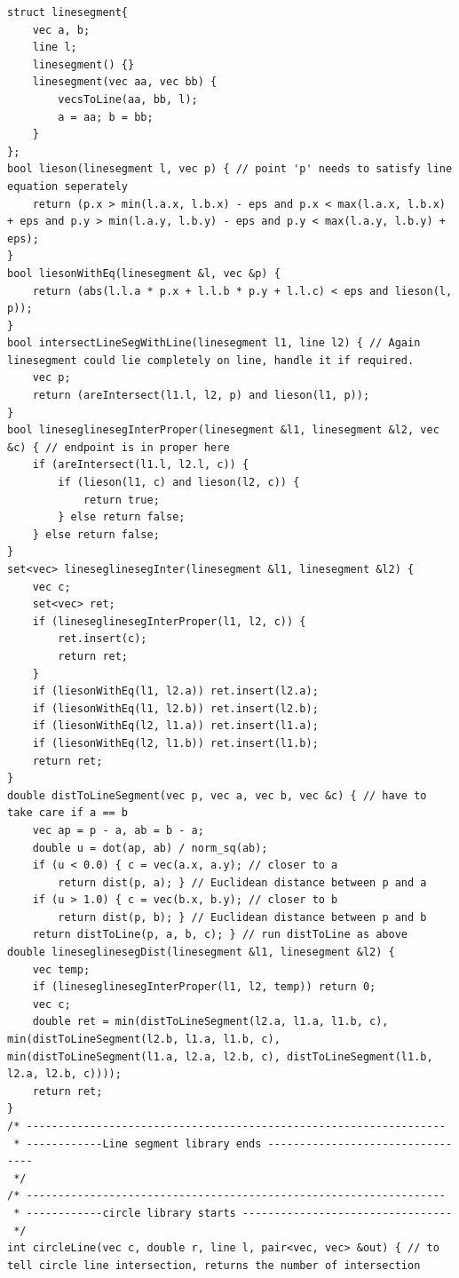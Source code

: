 \documentclass[8pt, a4paper, oneside, twocolumn]{extarticle}
\begin{document}
\begin{verbatim}
struct linesegment{
    vec a, b;
    line l;
    linesegment() {}
    linesegment(vec aa, vec bb) {
        vecsToLine(aa, bb, l);
        a = aa; b = bb;
    }
};
bool lieson(linesegment l, vec p) { // point 'p' needs to satisfy line equation seperately
    return (p.x > min(l.a.x, l.b.x) - eps and p.x < max(l.a.x, l.b.x) + eps and p.y > min(l.a.y, l.b.y) - eps and p.y < max(l.a.y, l.b.y) + eps);
}
bool liesonWithEq(linesegment &l, vec &p) {
    return (abs(l.l.a * p.x + l.l.b * p.y + l.l.c) < eps and lieson(l, p));
}
bool intersectLineSegWithLine(linesegment l1, line l2) { // Again linesegment could lie completely on line, handle it if required.
    vec p;
    return (areIntersect(l1.l, l2, p) and lieson(l1, p));
}
bool lineseglinesegInterProper(linesegment &l1, linesegment &l2, vec &c) { // endpoint is in proper here
    if (areIntersect(l1.l, l2.l, c)) {
        if (lieson(l1, c) and lieson(l2, c)) {
            return true;
        } else return false;
    } else return false;
}
set<vec> lineseglinesegInter(linesegment &l1, linesegment &l2) {
    vec c;
    set<vec> ret;
    if (lineseglinesegInterProper(l1, l2, c)) {
        ret.insert(c);
        return ret;
    }
    if (liesonWithEq(l1, l2.a)) ret.insert(l2.a);
    if (liesonWithEq(l1, l2.b)) ret.insert(l2.b);
    if (liesonWithEq(l2, l1.a)) ret.insert(l1.a);
    if (liesonWithEq(l2, l1.b)) ret.insert(l1.b);
    return ret;
}
double distToLineSegment(vec p, vec a, vec b, vec &c) { // have to take care if a == b
    vec ap = p - a, ab = b - a;
    double u = dot(ap, ab) / norm_sq(ab);
    if (u < 0.0) { c = vec(a.x, a.y); // closer to a
        return dist(p, a); } // Euclidean distance between p and a
    if (u > 1.0) { c = vec(b.x, b.y); // closer to b
        return dist(p, b); } // Euclidean distance between p and b
    return distToLine(p, a, b, c); } // run distToLine as above
double lineseglinesegDist(linesegment &l1, linesegment &l2) {
    vec temp;
    if (lineseglinesegInterProper(l1, l2, temp)) return 0;
    vec c;
    double ret = min(distToLineSegment(l2.a, l1.a, l1.b, c), min(distToLineSegment(l2.b, l1.a, l1.b, c), min(distToLineSegment(l1.a, l2.a, l2.b, c), distToLineSegment(l1.b, l2.a, l2.b, c))));
    return ret;
}
/* ------------------------------------------------------------------
 * ------------Line segment library ends ---------------------------------
 */
/* ------------------------------------------------------------------
 * ------------circle library starts ---------------------------------
 */
int circleLine(vec c, double r, line l, pair<vec, vec> &out) { // to tell circle line intersection, returns the number of intersection

\end{verbatim}
\end{document}
